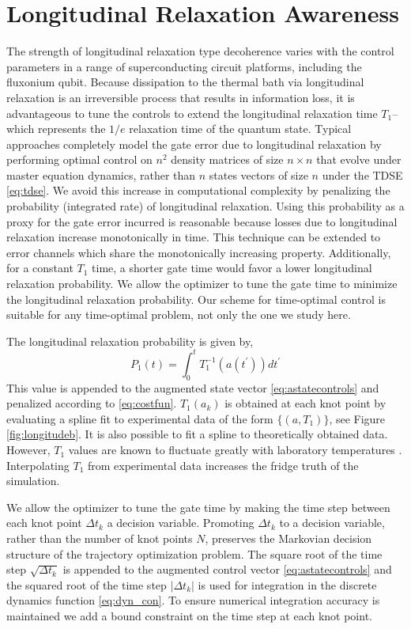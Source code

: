 \section{Longitudinal Relaxation Awareness \label{sec:longitude}}
The strength of longitudinal relaxation type decoherence varies
with the control parameters in a range of superconducting circuit platforms,
including the fluxonium qubit. Because dissipation to the thermal bath
via longitudinal relaxation is an irreversible process that results in information loss,
it is advantageous to tune the controls to extend the longitudinal
relaxation time $T_{1}$--which represents the $1/e$ relaxation time
of the quantum state.
Typical approaches completely model the gate error due to longitudinal
relaxation by performing optimal control on $n^{2}$
density matrices of size $n \times n$ that evolve under master
equation dynamics, rather than $n$ states vectors of size $n$
under the TDSE \eqref{eq:tdse}.
We avoid this increase in computational complexity by
penalizing the probability (integrated rate) of longitudinal relaxation.
Using this probability as a proxy for the gate error incurred
is reasonable because losses due to longitudinal relaxation increase monotonically
in time.
This technique can be extended to
error channels which share the monotonically increasing property.
Additionally, for a constant $T_{1}$ time, a shorter gate time
would favor a lower longitudinal relaxation probability. We allow
the optimizer to tune the gate time to minimize the
longitudinal relaxation probability. Our scheme for time-optimal
control is suitable for any time-optimal problem, not only
the one we study here.

The longitudinal relaxation probability is given by,
\begin{equation}
  P_{1}(t) = \int_{0}^{t} T_{1}^{-1}(a(t^{\prime})) dt^{\prime}
\end{equation}
This value is appended to the augmented state vector \eqref{eq:astatecontrols}
and penalized according to \eqref{eq:costfun}.
$T_{1}(a_{k})$ is obtained at each knot point by evaluating
a spline fit to experimental data of the form $\{(a, T_{1})\}$,
see Figure \ref{fig:longitudeb}.
It is also possible to fit a spline to theoretically obtained data.
However, $T_{1}$ values are known to fluctuate greatly
with laboratory temperatures \cite{klimov2018fluctuations}.
Interpolating $T_{1}$ from experimental data
increases the fridge truth of the simulation.

We allow the optimizer to tune the gate time by
making the time step between each knot point $\Delta t_{k}$
a decision variable. Promoting $\Delta t_{k}$ to a decision variable, rather
than the number of knot points $N$, preserves the
Markovian decision structure of the trajectory
optimization problem. The square root of the time step $\sqrt{\Delta t_{k}}$
is appended to the augmented control vector \eqref{eq:astatecontrols}
and the squared root
of the time step $\lvert \Delta t_{k} \rvert$ is used
for integration in the discrete dynamics function \eqref{eq:dyn_con}.
To ensure numerical
integration accuracy is maintained we add a bound
constraint on the time step at each knot point.

